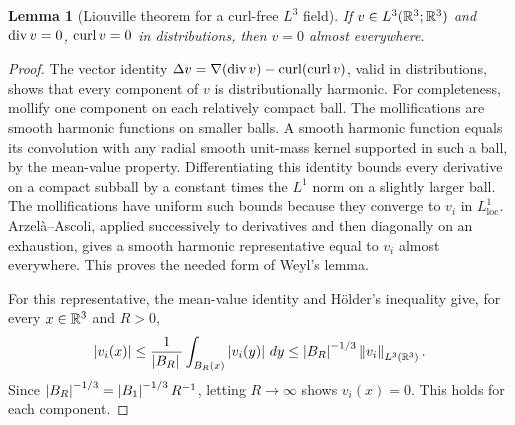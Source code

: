 \documentclass[11pt,letterpaper]{article}
\numberwithin{equation}{section}
\theoremstyle{plain}
\newtheorem{lemma}[theorem]{Lemma}
\theoremstyle{definition}
\theoremstyle{remark}
\begin{document}
\begin{lemma}[Liouville theorem for a curl-free $L^3$ field]\label{lem:liouville-L3}
If $v\in L^3(\mathbb{R}^3;\mathbb{R}^3)$ and $\operatorname{div} v=0$, $\operatorname{curl} v=0$ in distributions,
then $v=0$ almost everywhere.
\end{lemma}

\begin{proof}
The vector identity
$\Delta v=\nabla(\operatorname{div} v)-\operatorname{curl}(\operatorname{curl} v)$, valid in distributions,
shows that every component of $v$ is distributionally harmonic. For
completeness, mollify one component on each relatively compact ball. The
mollifications are smooth harmonic functions on smaller balls. A smooth
harmonic function equals its convolution with any radial smooth unit-mass
kernel supported in such a ball, by the mean-value property. Differentiating
this identity bounds every derivative on a compact subball by a constant
times the $L^1$ norm on a slightly larger ball. The mollifications have
uniform such bounds because they converge to $v_i$ in $L^1_{\mathrm{loc}}$.
Arzel\`a--Ascoli, applied successively to derivatives and then diagonally on
an exhaustion, gives a smooth harmonic representative equal to $v_i$
almost everywhere. This proves the needed form of Weyl's lemma.

For this representative, the mean-value identity and H\"older's inequality
give, for every $x\in\mathbb{R}^3$ and $R>0$,
\[
 \left\lvert v_i(x)\right\rvert\le \frac1{\left\lvert B_R\right\rvert\,}\int_{B_R(x)}\left\lvert v_i(y)\right\rvert\,dy
 \le \left\lvert B_R\right\rvert^{-1/3}\left\lVert v_i\right\rVert_{L^3(\mathbb{R}^3)}.
\]
Since $\left\lvert B_R\right\rvert^{-1/3}=\left\lvert B_1\right\rvert^{-1/3}R^{-1}$, letting $R\to\infty$
shows $v_i(x)=0$. This holds for each component.
\end{proof}
\end{document}

